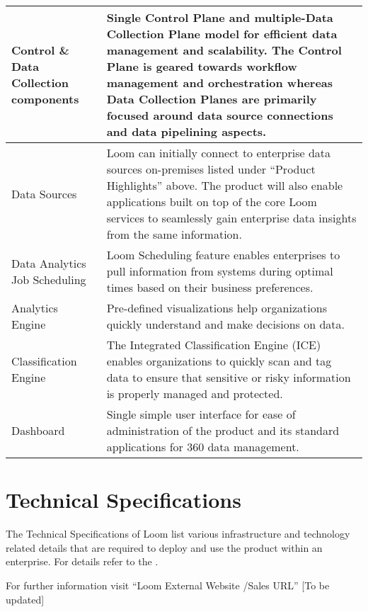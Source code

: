 \documentclass[letterpaper,10pt,english]{sphinxhowto}
\begin{document}
\begin{savenotes}\sphinxattablestart
\centering
\begin{tabulary}{\linewidth}[t]{|T|T|}
\hline

Control \& Data
Collection
components
&
Single Control Plane and multiple-Data Collection Plane model for efficient
data management and scalability. The Control Plane is geared towards workflow
management and orchestration whereas Data Collection Planes are primarily
focused around data source connections and data pipelining aspects.
\\
\hline
Data Sources
&
Loom can initially connect to enterprise data sources on-premises
listed under “Product Highlights” above. The product will also enable
applications built on top of the core Loom services to seamlessly gain
enterprise data insights from the same information.
\\
\hline
Data Analytics Job
Scheduling
&
Loom Scheduling feature enables enterprises to pull information from systems
during optimal times based on their business preferences.
\\
\hline
Analytics Engine
&
Pre-defined visualizations help organizations quickly understand and make
decisions on data.
\\
\hline
Classification Engine
&
The Integrated Classification Engine (ICE) enables organizations to quickly
scan and tag data to ensure that sensitive or risky information is properly
managed and protected.
\\
\hline
Dashboard
&
Single simple user interface for ease of administration of the product and
its standard applications for 360 data management.
\\
\hline
\end{tabulary}
\par
\sphinxattableend\end{savenotes}


\section{Technical Specifications}
\label{\detokenize{col/ds/mcdmp_ds_opt3:technical-specifications}}
The Technical Specifications of Loom list various infrastructure and technology related details that are required to deploy and use the product within an enterprise. For details refer to the .

For further information visit “Loom External Website /Sales URL” {[}To be updated{]}

\begin{figure}[htbp]
\centering

\noindent{}
\end{figure}



\renewcommand{\indexname}{Index}
\printindex
\end{document}
